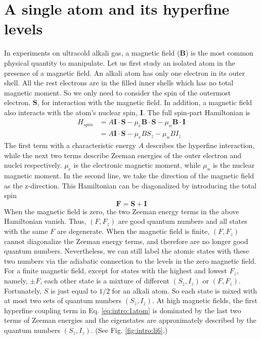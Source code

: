 \section{A single atom and its hyperfine levels}
In experiments on ultracold alkali gas, a magnetic field ($\mathbf{B}$) is the most common physical quantity to manipulate.   Let us first study an   isolated atom in the presence of a magnetic field.  An alkali atom has only one electron in its outer shell.  All the rest electrons are in the filled inner shells which  has no total magnetic moment.  So we only need to consider the spin of the outermost electron,  $\mathbf{S}$, for interaction with the magnetic field. In addition, a magnetic field also interacts with the atom's nuclear spin, $\mathbf{I}$.  The full spin-part Hamiltonian is
\begin{equation}
\begin{split}\label{eq:intro:1atom}
H_{spin}&=A \mathbf{I}\cdot\mathbf{S}-\mu_{e}\mathbf{B}\cdot\mathbf{S}-{\mu}_{n}\mathbf{B}\cdot\mathbf{I}\\
&=A \mathbf{I}\cdot\mathbf{S}-\mu_{e}{B}{S_{z}}-{\mu}_{n}{B}{I_{z}}
\end{split}
\end{equation}
The first term with a characteristic energy $A$ describes the hyperfine interaction, while the next two terms describe Zeeman energies of the outer electron and nuclei respectively. $\mu_{e}$ is the electronic magnetic moment, while $\mu_n$ is the nuclear magnetic moment.  In the second line, we take the direction of the magnetic field as the z-direction. This Hamiltonian can be diagonalized by introducing the total spin 
\begin{equation}
\mathbf{F}=\mathbf{S}+\mathbf{I}
\end{equation}
When the magnetic field is zero, the two Zeeman energy terms in the above Hamiltonian vanish.  Thus, $(F,F_{z})$ are good quantum numbers and all states with the same $F$ are degenerate.   When the magnetic field is finite, $(F,F_{z})$ cannot diagonalize the Zeeman energy terms, and therefore are no longer good quantum numbers. Nevertheless, we can still label the atomic  states with these two numbers via the adiabatic connection to the levels in the zero magnetic field.  For a finite magnetic field, except for states with the highest and lowest $F_{z}$, namely, $\pm{}F$, each other state is a mixture of different $(S_{z}, I_{z})$ or $(F,F_z)$.  Fortunately, $S$ is just equal to $1/2$ for an alkali atom. So each state is mixed with at most  two sets of quantum numbers $(S_{z}, I_{z})$. At high magnetic fields, the first hyperfine coupling term in Eq. \eqref{eq:intro:1atom} is dominated by the last two terms of Zeeman energies and the eigenstates are approximately described by the quantum numbers $(S_{z},I_{z})$.  (See Fig. \ref{fig:intro:li6}.)

